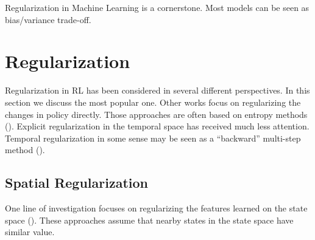 Regularization in Machine Learning is a cornerstone. Most models can be seen as bias/variance trade-off.
\section{Regularization}
Regularization in RL has been considered in several different perspectives. In this section we discuss the most popular one. Other works focus on regularizing the changes in policy directly. Those approaches are often based on entropy methods (\cite{neu2017unified,schulman2017proximal,bartlett2009regal}).
Explicit regularization in the temporal space has received much less attention.
Temporal regularization in some sense may be seen as a ``backward'' multi-step method (\cite{sutton1998reinforcement}). 
\subsection{Spatial Regularization}
 One line of investigation focuses on regularizing the features learned on the state space (\cite{massoud2009regularized,petrik2010feature,pazis2011non,farahmand2011regularization,liu2012regularized,harrigan2016deep}). These approaches assume that nearby states in the state space have similar value.


